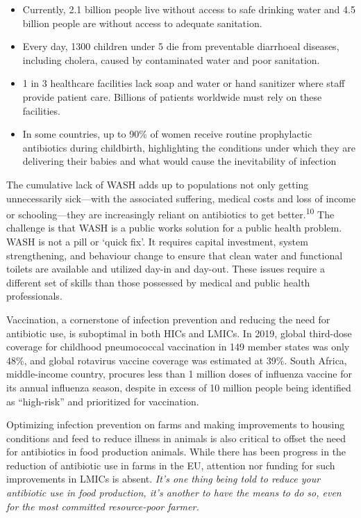 \documentclass[
  11pt,
  paper=a4,
  ,captions=tableheading
]{scrartcl}
\providecommand{\tightlist}{%
  \setlength{\itemsep}{0pt}\setlength{\parskip}{0pt}}
\begin{document}
\begin{itemize}
\tightlist
\item
  Currently, 2.1 billion people live without access to safe drinking
  water and 4.5 billion people are without access to adequate
  sanitation.
\item
  Every day, 1300 children under 5 die from preventable diarrhoeal
  diseases, including cholera, caused by contaminated water and poor
  sanitation.
\item
  1 in 3 healthcare facilities lack soap and water or hand sanitizer
  where staff provide patient care. Billions of patients worldwide must
  rely on these facilities.
\item
  In some countries, up to 90\% of women receive routine prophylactic
  antibiotics during childbirth, highlighting the conditions under which
  they are delivering their babies and what would cause the
  inevitability of infection
\end{itemize}

The cumulative lack of WASH adds up to populations not only getting
unnecessarily sick---with the associated suffering, medical costs and
loss of income or schooling---they are increasingly reliant on
antibiotics to get better.\textsuperscript{10} The challenge is that
WASH is a public works solution for a public health problem. WASH is not
a pill or `quick fix'. It requires capital investment, system
strengthening, and behaviour change to ensure that clean water and
functional toilets are available and utilized day-in and day-out. These
issues require a different set of skills than those possessed by medical
and public health professionals.

Vaccination, a cornerstone of infection prevention and reducing the need
for antibiotic use, is suboptimal in both HICs and LMICs. In 2019,
global third-dose coverage for childhood pneumococcal vaccination in 149
member states was only 48\%, and global rotavirus vaccine coverage was
estimated at 39\%. South Africa, middle-income country, procures less
than 1 million doses of influenza vaccine for its annual influenza
season, despite in excess of 10 million people being identified as
``high-risk'' and prioritized for vaccination.

Optimizing infection prevention on farms and making improvements to
housing conditions and feed to reduce illness in animals is also
critical to offset the need for antibiotics in food production animals.
While there has been progress in the reduction of antibiotic use in
farms in the EU, attention nor funding for such improvements in LMICs is
absent. \emph{It's one thing being told to reduce your antibiotic use in
food production, it's another to have the means to do so, even for the
most committed resource-poor farmer.}
\end{document}
